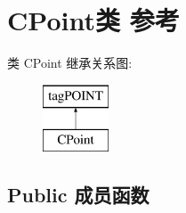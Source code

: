 \hypertarget{class_c_point}{}\section{C\+Point类 参考}
\label{class_c_point}
类 C\+Point 继承关系图\+:\begin{figure}[H]
\begin{center}
\leavevmode
\includegraphics[height=2.000000cm]{class_c_point}
\end{center}
\end{figure}
\subsection*{Public 成员函数}
